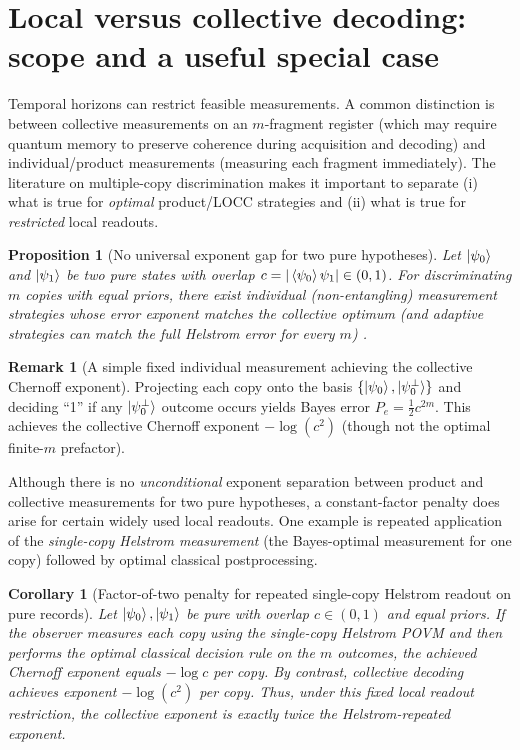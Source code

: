 \documentclass[aps,pra,twocolumn,superscriptaddress,nofootinbib]{revtex4-2}
\newcommand{\1}{\mathbf{1}}
\theoremstyle{definition}
\newtheorem{remark}{Remark}
\theoremstyle{plain}
\newtheorem{proposition}{Proposition}
\newtheorem{corollary}{Corollary}
\begin{document}
\section{Local versus collective decoding: scope and a useful special case}
\label{sec:local-vs-global}

Temporal horizons can restrict feasible measurements.
A common distinction is between collective measurements on an $m$-fragment register (which may require quantum memory to preserve coherence during acquisition and decoding) and individual/product measurements (measuring each fragment immediately).
The literature on multiple-copy discrimination makes it important to separate (i) what is true for \emph{optimal} product/LOCC strategies and (ii) what is true for \emph{restricted} local readouts.

\begin{proposition}[No universal exponent gap for two pure hypotheses]
\label{prop:no-gap-pure}
Let $\ket{\psi_0}$ and $\ket{\psi_1}$ be two pure states with overlap $c=|\braket{\psi_0}{\psi_1}|\in(0,1)$.
For discriminating $m$ copies with equal priors, there exist individual (non-entangling) measurement strategies whose error exponent matches the collective optimum (and adaptive strategies can match the full Helstrom error for every $m$) \cite{AcinBaganBaigMasanesMunozTapia2005}.
\end{proposition}

\begin{remark}[A simple fixed individual measurement achieving the collective Chernoff exponent]
Projecting each copy onto the basis $\{\ket{\psi_0},\ket{\psi_0^\perp}\}$ and deciding ``1'' if any $\ket{\psi_0^\perp}$ outcome occurs yields Bayes error $P_e=\tfrac12 c^{2m}$.
This achieves the collective Chernoff exponent $-\log(c^{2})$ (though not the optimal finite-$m$ prefactor).
\end{remark}

Although there is no \emph{unconditional} exponent separation between product and collective measurements for two pure hypotheses, a constant-factor penalty does arise for certain widely used local readouts.
One example is repeated application of the \emph{single-copy Helstrom measurement} (the Bayes-optimal measurement for one copy) followed by optimal classical postprocessing.

\begin{corollary}[Factor-of-two penalty for repeated single-copy Helstrom readout on pure records]
\label{cor:helstrom-penalty}
Let $\ket{\psi_0},\ket{\psi_1}$ be pure with overlap $c\in(0,1)$ and equal priors.
If the observer measures each copy using the single-copy Helstrom POVM and then performs the optimal classical decision rule on the $m$ outcomes, the achieved Chernoff exponent equals $-\log c$ per copy.
By contrast, collective decoding achieves exponent $-\log(c^2)$ per copy.
Thus, under this \emph{fixed local readout restriction}, the collective exponent is exactly twice the Helstrom-repeated exponent.
\end{corollary}
\end{document}
